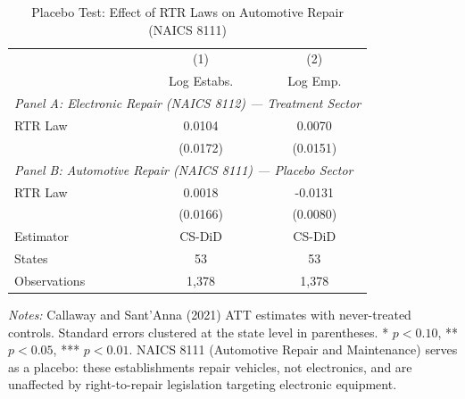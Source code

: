 \begin{table}[H]
\centering
\caption{Placebo Test: Effect of RTR Laws on Automotive Repair (NAICS 8111)}
\label{tab:placebo}
\begin{threeparttable}
\begin{tabular}{lcc}
\toprule
 & (1) & (2) \\
 & Log Estabs. & Log Emp. \\
\midrule
\multicolumn{3}{l}{\textit{Panel A: Electronic Repair (NAICS 8112) --- Treatment Sector}} \\[0.3em]
RTR Law & 0.0104 & 0.0070 \\
 & (0.0172) & (0.0151) \\[0.5em]
\multicolumn{3}{l}{\textit{Panel B: Automotive Repair (NAICS 8111) --- Placebo Sector}} \\[0.3em]
RTR Law & 0.0018 & -0.0131 \\
 & (0.0166) & (0.0080) \\
\midrule
Estimator & CS-DiD & CS-DiD \\
States & 53 & 53 \\
Observations & 1,378 & 1,378 \\
\bottomrule
\end{tabular}
\begin{tablenotes}[flushleft]
\small
\item \textit{Notes:} Callaway and Sant'Anna (2021) ATT estimates with never-treated controls. Standard errors clustered at the state level in parentheses. * $p<0.10$, ** $p<0.05$, *** $p<0.01$. NAICS 8111 (Automotive Repair and Maintenance) serves as a placebo: these establishments repair vehicles, not electronics, and are unaffected by right-to-repair legislation targeting electronic equipment.
\end{tablenotes}
\end{threeparttable}
\end{table}
